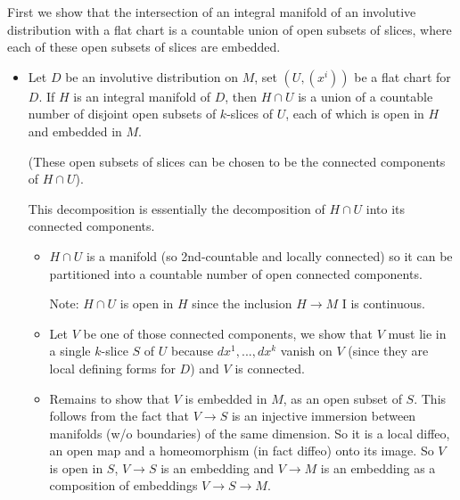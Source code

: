 \documentclass{report}
\theoremstyle{definition}
\begin{document}
First we show that the intersection of an integral manifold of an involutive distribution with a flat chart is a countable union of open subsets of slices, where each of these open subsets of slices are embedded.
\begin{itemize}
    \item Let $D$ be an involutive distribution on $M$, set $(U,(x^i))$ be a flat chart for $D$. If $H$ is an integral manifold of $D$, then $H\cap U$ is a union of a countable number of disjoint open subsets of $k$-slices of $U$, each of which is open in $H$ and embedded in $M$.

    (These open subsets of slices can be chosen to be the connected components of $H\cap U$).

    This decomposition is essentially the decomposition of $H\cap U$ into its connected components.
    \begin{itemize}
        \item $H\cap U$ is a manifold (so 2nd-countable and locally connected) so it can be partitioned into a countable number of open connected components.

        Note: $H\cap U$ is open in $H$ since the inclusion $H\to M$ I is continuous.
        \item Let $V$ be one of those connected components, we show that $V$ must lie in a single $k$-slice $S$ of $U$ because $dx^1,...,dx^k$ vanish on $V$ (since they are local defining forms for $D$) and $V$ is connected.
        \item Remains to show that $V$ is embedded in $M$, as an open subset of $S$. This follows from the fact that $V\to S$ is an injective immersion between manifolds (w/o boundaries) of the same dimension. So it is a local diffeo, an open map and a homeomorphism (in fact diffeo) onto its image. So $V$ is open in $S$, $V\to S$ is an embedding and $V\to M$ is an embedding as a composition of embeddings $V\to S\to M$.
    \end{itemize}
\end{itemize}
\end{document}
